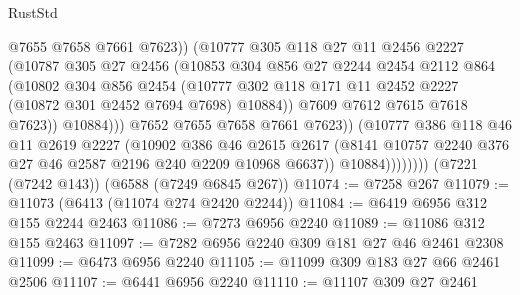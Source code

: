 \begin{lexlean}{RustStd}
\begin{coremodule}
                              @7655
                              @7658
                              @7661
                              @7623))
                          (@10777
                            @305
                            @118
                            @27
                            @11
                            @2456
                            @2227
                            (@10787
                              @305
                              @27
                              @2456
                              (@10853
                                @304
                                @856
                                @27
                                @2244
                                @2454
                                @2112
                                @864
                                (@10802
                                  @304
                                  @856
                                  @2454
                                  (@10777
                                    @302
                                    @118
                                    @171
                                    @11
                                    @2452
                                    @2227
                                    (@10872 @301 @2452 @7694 @7698)
                                    @10884))
                                @7609
                                @7612
                                @7615
                                @7618
                                @7623))
                            @10884)))
                      @7652
                      @7655
                      @7658
                      @7661
                      @7623))
                  (@10777
                    @386
                    @118
                    @46
                    @11
                    @2619
                    @2227
                    (@10902
                      @386
                      @46
                      @2615
                      @2617
                      (@8141 @10757 @2240 @376 @27 @46 @2587 @2196 @240 @2209 @10968 @6637))
                    @10884))))))))
    (@7221 (@7242 @143))
    (@6588 (@7249 @6845 @267))
@11074 := @7258 @267
@11079 := @11073 (@6413 (@11074 @274 @2420 @2244))
@11084 := @6419 @6956 @312 @155 @2244 @2463
@11086 := @7273 @6956 @2240
@11089 := @11086 @312 @155 @2463
@11097 := @7282 @6956 @2240 @309 @181 @27 @46 @2461 @2308
@11099 := @6473 @6956 @2240
@11105 := @11099 @309 @183 @27 @66 @2461 @2506
@11107 := @6441 @6956 @2240
@11110 := @11107 @309 @27 @2461

\end{coremodule}
\end{lexlean}
